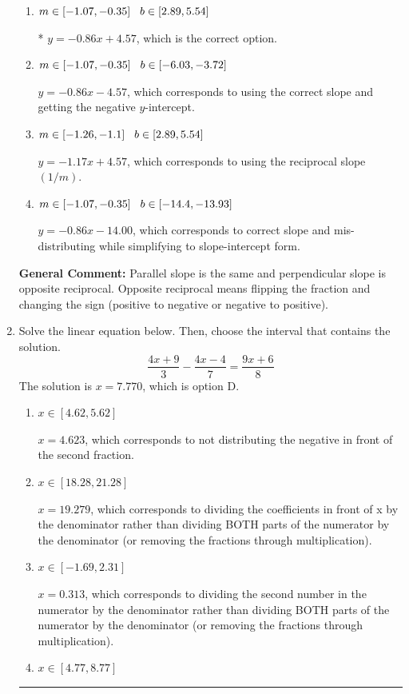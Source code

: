 \documentclass{extbook}[14pt]
\newcommand{\litem}[1]{\item #1

\rule{\textwidth}{0.4pt}}
\begin{document}
\begin{enumerate}
{\begin{enumerate}[label=\Alph*.]
 $y = 0.86x - 12.57$, which corresponds to using the negative slope.
\item \( m \in [-1.07, -0.35] \hspace*{3mm} b \in [2.89, 5.54] \)

* $y = -0.86x + 4.57$, which is the correct option.
\item \( m \in [-1.07, -0.35] \hspace*{3mm} b \in [-6.03, -3.72] \)

 $y = -0.86x - 4.57$, which corresponds to using the correct slope and getting the negative $y$-intercept.
\item \( m \in [-1.26, -1.1] \hspace*{3mm} b \in [2.89, 5.54] \)

 $y = -1.17x + 4.57$, which corresponds to using the reciprocal slope $(1/m)$.
\item \( m \in [-1.07, -0.35] \hspace*{3mm} b \in [-14.4, -13.93] \)

 $y = -0.86x - 14.00$, which corresponds to correct slope and mis-distributing while simplifying to slope-intercept form.
\end{enumerate}

\textbf{General Comment:} Parallel slope is the same and perpendicular slope is opposite reciprocal. Opposite reciprocal means flipping the fraction and changing the sign (positive to negative or negative to positive).
}
\litem{
Solve the linear equation below. Then, choose the interval that contains the solution.
\[ \frac{4x + 9}{3} - \frac{4x -4}{7} = \frac{9x + 6}{8} \]The solution is \( x = 7.770 \), which is option D.\begin{enumerate}[label=\Alph*.]
\item \( x \in [4.62, 5.62] \)

 $x = 4.623$, which corresponds to not distributing the negative in front of the second fraction.
\item \( x \in [18.28, 21.28] \)

 $x = 19.279$, which corresponds to dividing the coefficients in front of x by the denominator rather than dividing BOTH parts of the numerator by the denominator (or removing the fractions through multiplication).
\item \( x \in [-1.69, 2.31] \)

 $x = 0.313$, which corresponds to dividing the second number in the numerator by the denominator rather than dividing BOTH parts of the numerator by the denominator (or removing the fractions through multiplication).
\item \( x \in [4.77, 8.77] \)


\end{enumerate}}
\end{enumerate}
\end{document}
